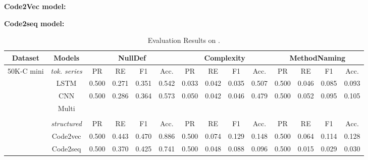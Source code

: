 \documentclass[sigplan,review,anonymous]{acmart}\settopmatter{printfolios=true,printccs=false,printacmref=false}
\begin{document}

\noindent
\textbf{Code2Vec model: \newline}

\noindent
\textbf{Code2seq model: \newline} 

\begin{table*}[t]
\centering
\caption{Evaluation Results on \minibenchmarkName.}
\begin{tabular}{|c|c|c|c|c|c|c|c|c|c|c|c|c|c|}
\hline
Dataset                  & Models   & \multicolumn{4}{N|}{NullDef}  & \multicolumn{4}{N|}{ Complexity } & \multicolumn{4}{N|}{ MethodNaming }  \\ \hline
\multirow{}{}{ 50K-C \n mini }   & \textit{tok. series}         & PR & RE & F1 & Acc.            & PR & RE & F1 & Acc.              & PR & RE & F1 & Acc.                  \\ \cline{2-14}\cline{2-14}
                         
                         & LSTM     & 0.500   & 0.271  & 0.351   & 0.542               & 0.033   & 0.042    & 0.035   & 0.507                    & 0.500   & 0.046    & 0.085   & 0.093                    \\ \cline{2-14}
                         & CNN      & 0.500   & 0.286    & 0.364   & 0.573               & 0.050   & 0.042   & 0.046   & 0.479                   & 0.500   & 0.052   & 0.095   & 0.105                   \\ \cline{2-14}
                         & Multi &    &    &    &                &    &    &    &                    &    &    &    &                    \\ \cline{2-14} 
                         
                         & \multicolumn{13}{l|}{}                                                                                            \\ \cline{2-14}
                         & \textit{structured}         & PR & RE & F1 & Acc.            & PR & RE & F1 & Acc.              & PR & RE & F1 & Acc.               \\ \cline{2-14}\cline{2-14}
                         
                         & Code2vec & 0.500   & 0.443   & 0.470   & 0.886              & 0.500  & 0.074 & 0.129 & 0.148                  & 0.500   & 0.064   & 0.114   & 0.128                 \\ \cline{2-14}
                         & Code2seq & 0.500    & 0.370   & 0.425   & 0.741               & 0.500    & 0.048   & 0.088    & 0.096                    & 0.500    & 0.015   & 0.029     & 0.030                \\ \hline
\end{tabular}
\end{table*}
\end{document}
